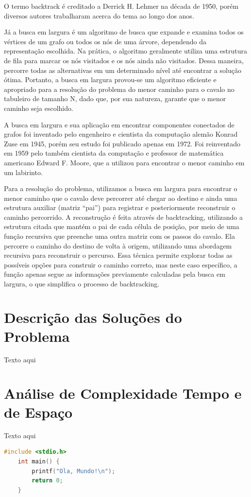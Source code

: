 \documentclass[relatorio]{IEEEtran}
\begin{document}
O termo backtrack é creditado a Derrick H. Lehmer na década de 1950, porém diversos autores trabalharam acerca do tema ao longo dos anos.

Já a busca em largura é um algoritmo de busca que expande e examina todos os vértices de um grafo ou todos os nós de uma árvore, dependendo da representação escolhida. Na prática, o algoritmo geralmente utiliza uma estrutura de fila para marcar os nós visitados e os nós ainda não visitados. Dessa maneira, percorre todas as alternativas em um determinado nível até encontrar a solução ótima. Portanto, a busca em largura provou-se um algoritmo eficiente e apropriado para a resolução do problema do menor caminho para o cavalo no tabuleiro de tamanho N, dado que, por sua natureza, garante que o menor caminho seja escolhido.

A busca em largura e sua aplicação em encontrar componentes conectados de grafos foi inventado pelo engenheiro e cientista da computação alemão Konrad Zuse em 1945, porém seu estudo foi publicado apenas em 1972. Foi reinventado em 1959 pelo também cientista da computação e professor de matemática americano Edward F. Moore, que a utilizou para encontrar o menor caminho em um labirinto.

Para a resolução do problema, utilizamos a busca em largura para encontrar o menor caminho que o cavalo deve percorrer até chegar ao destino e ainda uma estrutura auxiliar (matriz “pai”) para registrar e posteriormente reconstruir o caminho percorrido. A reconstrução é feita através de backtracking, utilizando a estrutura citada que mantém o pai de cada célula de posição, por meio de uma função recursiva que preenche uma outra matriz com os passos do cavalo. Ela percorre o caminho do destino de volta à origem, utilizando uma abordagem recursiva para reconstruir o percurso. Essa técnica permite explorar todas as possíveis opções para construir o caminho correto, mas neste caso específico, a função apenas segue as informações previamente calculadas pela busca em largura, o que simplifica o processo de backtracking.

\section{Descrição das Soluções do Problema}
Texto aqui
\section{Análise de Complexidade Tempo e de Espaço}
Texto aqui
\begin{lstlisting}[language=C]
    #include <stdio.h>
    int main() {
        printf("Ola, Mundo!\n");
        return 0;
    }
\end{lstlisting}
\end{document}
